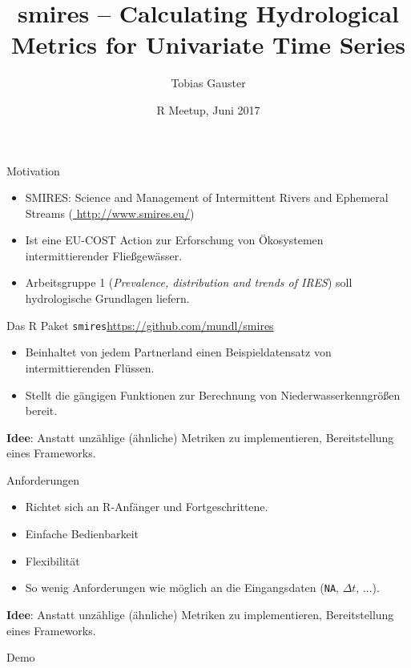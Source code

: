 \documentclass[xetex, german]{beamer}
\title{smires -- Calculating Hydrological Metrics for Univariate Time Series}
\author{Tobias Gauster}
\institute
{
    Institute of Applied Statistics and Computing\\
    BOKU, Vienna 
}
\date{R Meetup, Juni 2017}
\begin{document}
    
\begin{frame}
\titlepage
\end{frame}
 
\begin{frame}{Motivation}
  \begin{itemize}
      \item SMIRES: Science and Management of Intermittent Rivers and Ephemeral Streams (\url{ http://www.smires.eu/})
      \item Ist eine EU-COST Action zur Erforschung von Ökosystemen intermittierender Fließgewässer.
      \item Arbeitsgruppe 1 (\textit{Prevalence, distribution and trends of IRES}) soll hydrologische Grundlagen liefern.   
  \end{itemize}
\end{frame}
 
\begin{frame}{Das R Paket \texttt{smires}}{\url{https://github.com/mundl/smires}}
\begin{itemize}
    \item Beinhaltet von jedem Partnerland einen Beispieldatensatz von intermittierenden Flüssen. 
    \item Stellt die gängigen Funktionen zur Berechnung von Niederwasserkenngrößen bereit.
\end{itemize}

\vfill

\textbf{Idee}: Anstatt unzählige (ähnliche) Metriken zu implementieren, Bereitstellung eines Frameworks.

\vfill
\end{frame}

\begin{frame}{Anforderungen}
\begin{itemize}
    \item Richtet sich an R-Anfänger und Fortgeschrittene. 
    \item Einfache Bedienbarkeit
    \item Flexibilität
    \item So wenig Anforderungen wie möglich an die Eingangsdaten (\texttt{NA}, $\Delta t$, ...).
\end{itemize}

\textbf{Idee}: Anstatt unzählige (ähnliche) Metriken zu implementieren, Bereitstellung eines Frameworks.
\end{frame}

\begin{frame}{Demo}
\end{frame}
\end{document}
